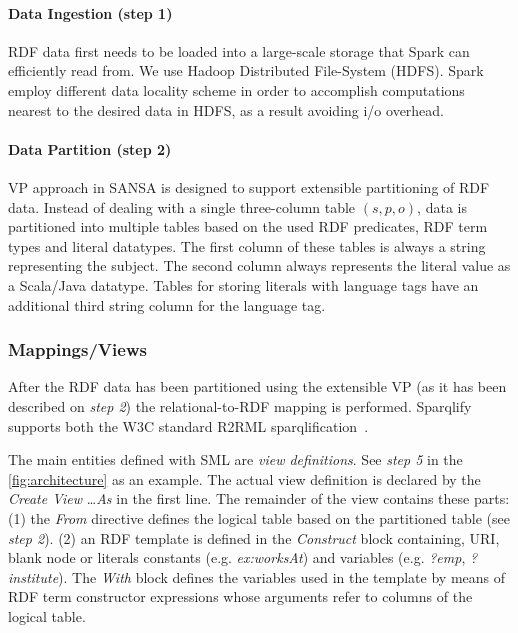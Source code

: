 \paragraph{Data Ingestion (step 1)} RDF data first needs to be loaded into a large-scale storage that Spark can efficiently read from.
We use Hadoop Distributed File-System (HDFS).
Spark employ different data locality scheme in order to accomplish computations nearest to the desired data in HDFS, as a result avoiding i/o overhead.
\paragraph{Data Partition (step 2)}
VP approach in SANSA is designed to support extensible partitioning of RDF data.
Instead of dealing with a single three-column table $(s, p, o)$, data is partitioned into multiple tables based on the used RDF predicates, RDF term types and literal datatypes.
The first column of these tables is always a string representing the subject.
The second column always represents the literal value as a Scala/Java datatype.
Tables for storing literals with language tags have an additional third string column for the language tag.
\subsubsection{Mappings/Views}
After the RDF data has been partitioned using the extensible VP (as it has been described on \textit{step 2}) the relational-to-RDF mapping is performed.
Sparqlify supports both the W3C standard R2RML
sparqlification~\cite{sml}.

The main entities defined with SML are \textit{view definitions}.
See \textit{step 5} in the \autoref{fig:architecture} as an example.
The actual view definition is declared by the \emph{Create View} \ldots \emph{As} in the first line.
The remainder of the view contains these parts: (1) the \emph{From} directive defines the logical table based on the partitioned table (see \textit{step 2}).
(2) an RDF template is defined in the \emph{Construct} block containing, URI, blank node or literals constants (e.g. \emph{ex:worksAt}) and variables (e.g. \emph{?emp}, \emph{?institute}).
The \emph{With} block defines the variables used in the template by means of RDF term constructor expressions whose arguments refer to columns of the logical table.

